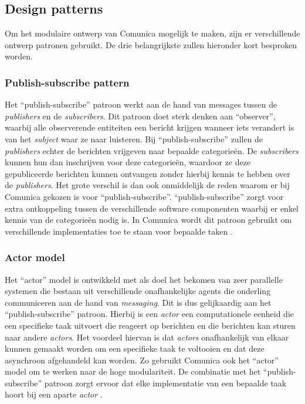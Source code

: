 \subsection{Design patterns}
Om het modulaire ontwerp van Comunica mogelijk te maken, zijn er verschillende ontwerp patronen gebruikt. De drie belangrijkste zullen hieronder kort besproken worden.

\subsubsection{Publish-subscribe pattern}
Het ``publish-subscribe'' patroon werkt aan de hand van messages tussen de \textit{publishers} en de \textit{subscribers}. Dit patroon doet sterk denken aan ``observer'', waarbij alle observerende entiteiten een bericht krijgen wanneer iets verandert is van het \textit{subject} waar ze naar luisteren. Bij ``publish-subscribe'' zullen de \textit{publishers} echter de berichten vrijgeven naar bepaalde categorieën. De \textit{subscribers} kunnen hun dan inschrijven voor deze categorieën, waardoor ze deze gepubliceerde berichten kunnen ontvangen zonder hierbij kennis te hebben over de \textit{publishers}. Het grote verschil is dan ook onmiddelijk de reden waarom er bij Comunica gekozen is voor ``publish-subscribe''. ``publish-subscribe'' zorgt voor extra ontkoppeling tussen de verschillende software componenten waarbij er enkel kennis van de categorieën nodig is. In Comunica wordt dit patroon gebruikt om verschillende implementaties toe te staan voor bepaalde taken \cite{taelman2018comunica}.

\subsubsection{Actor model}
Het ``actor'' model is ontwikkeld met als doel het bekomen van zeer parallelle systemen die bestaan uit verschillende onafhankelijke agents die onderling communiceren aan de hand van \textit{messaging}. Dit is dus gelijkaardig aan het ``publish-subscribe'' patroon. Hierbij is een \textit{actor} een computationele eenheid die een specifieke taak uitvoert die reageert op berichten en die berichten kan sturen naar andere \textit{actors}. Het voordeel hiervan is dat \textit{actors} onafhankelijk van elkaar kunnen gemaakt worden om een specifieke taak te voltooien en dat deze asynchroon afgehandeld kan worden. Zo gebruikt Comunica ook het ``actor'' model om te werken naar de hoge modulariteit. De combinatie met het ``publish-subscribe'' patroon zorgt ervoor dat elke implementatie van een bepaalde taak hoort bij een aparte \textit{actor} \cite{taelman2018comunica}.

